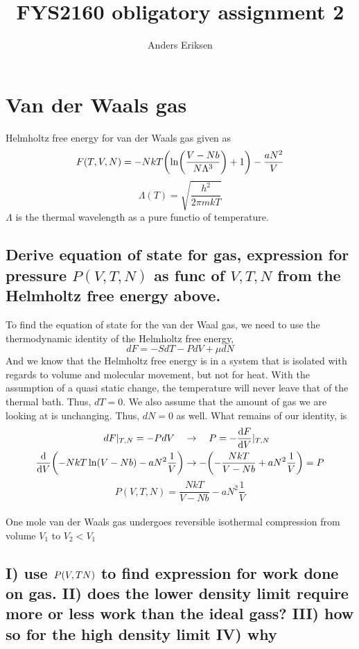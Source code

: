 \documentclass[a4paper,11pt]{article}
\begin{document}
	
\title{FYS2160 obligatory assignment 2}
\author{Anders Eriksen}
\maketitle


\section{Van der Waals gas}
Helmholtz free energy for van der Waals gas given as
\[ F( T, V, N ) = - N k T \qty( \ln(\frac{  V - Nb  }{ N\Lambda^3 } ) + 1 ) - \frac{ a N^2 }{ V } \]
\[ \Lambda( T ) = \sqrt{ \frac{ h^2 }{ 2\pi m k T } }  \]
$\Lambda$ is the thermal wavelength as a pure functio of temperature. 

\subsection{ Derive equation of state for gas, expression for pressure $P( V, T, N )$ as func of 
            $V, T, N$ from the Helmholtz free energy above. }%
To find the equation of state for the van der Waal gas, we need to use the thermodynamic identity of the Helmholtz free
energy, 
\[ dF = - SdT - PdV + \mu dN \]
And we know that the Helmholtz free energy is in a system that is isolated with regards to volume and molecular movement, but
not for heat. With the assumption of a quasi static change, the temperature will never leave that of the thermal bath. Thus, $dT=0$.
We also assume that the amount of gas we are looking at is unchanging. Thus, $dN=0$ as well. What remains of our identity, is
\begin{align*}
    dF|_{T,N} = - PdV \quad &\rightarrow \quad P = -\dv{F}{V}|_{T,N} \\
    \dv{V}\qty( -NkT\ln( V - Nb) - aN^2\frac{1}{V} ) &\rightarrow -\qty( -\frac{NkT}{V - Nb} + aN^2\frac{1}{V} ) = P \\
\end{align*}
\[ P( V, T, N ) =  \frac{NkT}{V - Nb} - aN^2\frac{1}{V} \]\\


One mole van der Waals gas undergoes reversible isothermal compression from volume $V_1$ to $V_2 < V_1$

\subsection{ I) use $P\qty(V, T N)$ to find expression for work done on gas. II) does the lower density 
            limit require more or less work than the ideal gass? III) how so for the high density limit IV) why}%
\end{document}
